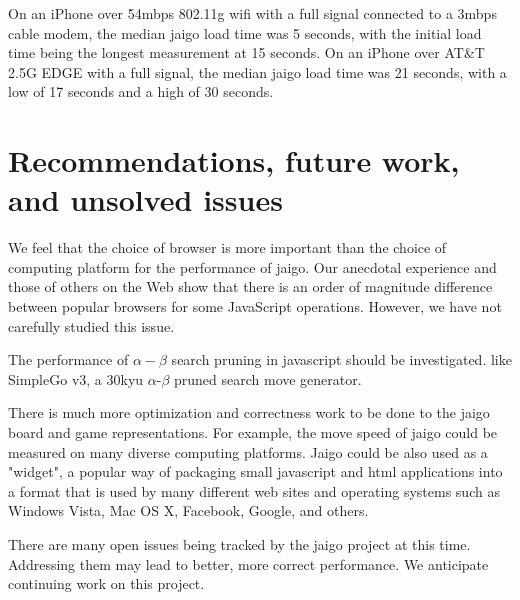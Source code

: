 \documentclass{memoir}
\begin{document}
On an iPhone over 54mbps 802.11g wifi with a full signal connected to a 3mbps cable modem, the median jaigo load time was 5 seconds, with the initial load time being the longest measurement at 15 seconds. On an iPhone over AT\&T 2.5G EDGE with a full signal, the median jaigo load time was 21 seconds, with a low of 17 seconds and a high of 30 seconds.

\chapter{Recommendations, future work, and unsolved issues}
We feel that the choice of browser is more important than the choice of computing platform for the performance of jaigo. Our anecdotal experience and those of others on the Web show that there is an order of magnitude difference between popular browsers for some JavaScript operations. However, we have not carefully studied this issue.%

The performance of $\alpha-\beta$ search pruning in javascript should be investigated. like SimpleGo v3, a 30kyu $\alpha$-$\beta$ pruned search move generator.

There is much more optimization and correctness work to be done to the jaigo board and game representations. For example, the move speed of jaigo could be measured on many diverse computing platforms. Jaigo could be also used as a "widget", a popular way of packaging small javascript and html applications into a format that is used by many different web sites and operating systems such as Windows Vista, Mac OS X, Facebook, Google, and others.

There are many open issues being tracked by the jaigo project at this time. Addressing them may lead to better, more correct performance. We anticipate continuing work on this project.

\backmatter


\end{document}
